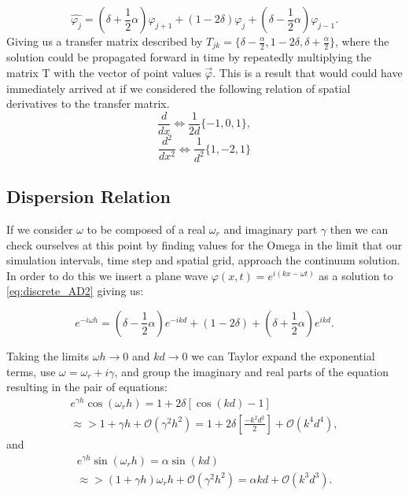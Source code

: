 \documentclass[]{article}
\begin{document}
\begin{equation}
	\hat{\varphi_j} = (\delta+\frac{1}{2}\alpha)\varphi_{j+1} +(1-2\delta)\varphi_{j}+(\delta-\frac{1}{2}\alpha)\varphi_{j-1}. 
	\label{eq:discrete_AD2}
\end{equation}
Giving us a transfer matrix described by $T_{jk} = \{\delta-\frac{\alpha}{2},1-2\delta,\delta+\frac{\alpha}{2}\}$, where the solution could be propagated forward in time by repeatedly multiplying the matrix T with the vector of point values $\vec{\varphi}$. 
This is a result that would could have immediately arrived at if we considered the following relation of spatial derivatives to the transfer matrix.
\begin{equation}
\frac{d}{dx} \Leftrightarrow \frac{1}{2d}\{-1,0,1\},
\label{eq:dx}
\end{equation}
\begin{equation}
\frac{d^2}{dx^2} \Leftrightarrow \frac{1}{d^2}\{1,-2,1\}
\label{eq:dx^2}
\end{equation}


\subsection{Dispersion Relation}
If we consider $\omega$ to be composed of a real $\omega_r$ and imaginary part $\gamma$ then we can check ourselves at this point by finding values for the Omega in the limit that our simulation intervals, time step and spatial grid, approach the continuum solution. 
In order to do this we insert a plane wave $\varphi(x,t) =e^{i(kx-\omega t)}$ as a solution to \ref{eq:discrete_AD2} giving us:

\begin{equation}
e^{-i\omega h} = (\delta-\frac{1}{2}\alpha)e^{-ikd} + (1-2\delta) +(\delta+\frac{1}{2}\alpha)e^{ikd}.
\end{equation}

Taking the limits $\omega h \to 0$ and $kd \to 0$ we can Taylor expand the exponential terms, use $\omega = \omega_r + i\gamma$, and group the imaginary and real parts of the equation resulting in the pair of equations:
\begin{gather}
\nonumber
e^{\gamma h}\cos(\omega_r h) = 1 + 2\delta \left[\cos(kd)-1\right] \\
\approx > 1+\gamma h +\mathcal{O}(\gamma^2h^2) =  1 + 2\delta \left[\frac{-k^2d^2}{2}\right] +\mathcal{O}(k^4d^4),
\label{eq:disp_1}
\end{gather}
and
\begin{gather}
\nonumber
e^{\gamma h}\sin(\omega_r h) =  \alpha \sin(kd) \\
\approx>  (1+\gamma h)\omega_r h +\mathcal{O}(\gamma^2h^2) = \alpha kd +\mathcal{O}(k^3d^3).
\label{eq:disp_2}
\end{gather}
\end{document}
